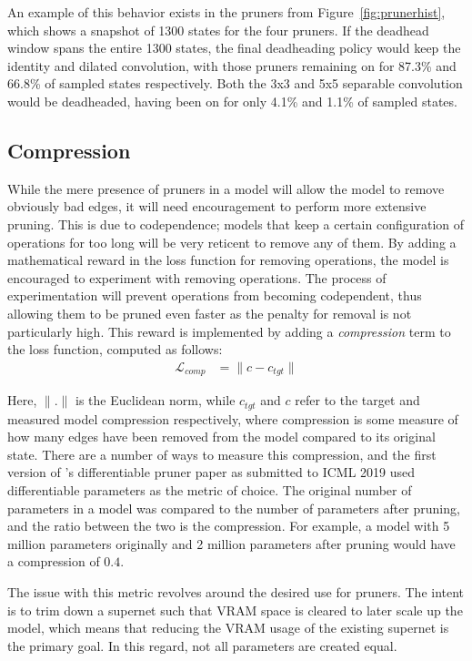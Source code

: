 An example of this behavior exists in the pruners from Figure~\ref{fig:prunerhist}, which shows a snapshot of 1300 states for the four pruners. If the deadhead window
spans the entire 1300 states, the final deadheading policy would keep the identity and dilated convolution, with those
pruners remaining on for 87.3\% and 66.8\% of sampled states respectively. Both the 3x3 and 5x5 separable convolution would be
deadheaded, having been on for only 4.1\% and 1.1\% of sampled states.

\subsection{Compression}
While the mere presence of pruners in a model will allow the model to remove obviously bad edges, it will need
encouragement to perform more extensive pruning. This is due to codependence; models that keep a certain configuration
of operations for too long will be very reticent to remove any of them. By adding a mathematical reward in the loss function
for removing operations, the model is encouraged to experiment with removing operations. The process of experimentation
will prevent operations from becoming codependent, thus allowing them to be pruned even faster as the penalty for removal
is not particularly high. This reward is implemented by adding a \textit{compression} term to the loss
function, computed as follows:
\begin{align}
	\mathcal{L}_{comp} &= \lVert c - c_{tgt} \rVert \label{eq:comp_term}
\end{align}

\noindent Here, $\lVert . \rVert$ is the Euclidean norm, while $c_{tgt}$ and $c$ refer to the target and measured model
compression respectively, where compression is some measure of how many edges have been removed from the model compared
to its original state. There are a number of ways to measure this compression, and the
first version of \citeauthor{kim2019v1}'s differentiable pruner paper as submitted to ICML 2019
used differentiable parameters as the metric of choice. The original number of parameters in a model was compared to the number of parameters after pruning, and the ratio between the two is
the compression. For example, a model with 5 million parameters originally and 2 million parameters after pruning would have
a compression of $0.4$.

The issue with this metric revolves around the desired use for pruners. The intent is to trim down a supernet such
that VRAM space is cleared to later scale up the model, which means that reducing the VRAM usage of the existing supernet
is the primary goal. In this regard, not all parameters are created equal.

